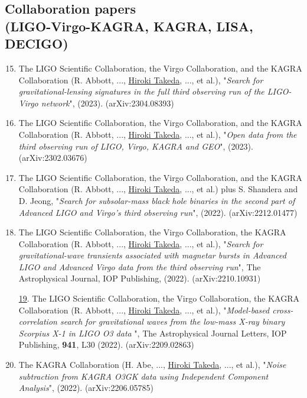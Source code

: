\documentclass[uplatex, 12pt]{article}
\begin{document}
\subsection*{Collaboration papers \\(LIGO-Virgo-KAGRA, KAGRA, LISA, DECIGO)}
\begin{enumerate}
\setcounter{enumi}{14}
\item The LIGO Scientific Collaboration, the Virgo Collaboration, and the KAGRA Collaboration (R. Abbott, ..., \uline{Hiroki Takeda}, ..., et al.), "\emph{Search for gravitational-lensing signatures in the full third observing run of the LIGO-Virgo network}", (2023). (arXiv:2304.08393)\\

\item The LIGO Scientific Collaboration, the Virgo Collaboration, and the KAGRA Collaboration (R. Abbott, ..., \uline{Hiroki Takeda}, ..., et al.), "\emph{Open data from the third observing run of LIGO, Virgo, KAGRA and GEO}", (2023). (arXiv:2302.03676)\\

\item The LIGO Scientific Collaboration, the Virgo Collaboration, and the KAGRA Collaboration (R. Abbott, ..., \uline{Hiroki Takeda}, ..., et al.) plus S. Shandera and D. Jeong, "\emph{Search for subsolar-mass black hole binaries in the second part of Advanced LIGO and Virgo's third observing run}", (2022). (arXiv:2212.01477)\\

\item The LIGO Scientific Collaboration, the Virgo Collaboration, the KAGRA Collaboration (R. Abbott, ..., \uline{Hiroki Takeda}, ..., et al.), "\emph{Search for gravitational-wave transients associated with magnetar bursts in Advanced LIGO and Advanced Virgo data from the third observing run}", The Astrophysical Journal, IOP Publishing, (2022). (arXiv:2210.10931)\\

\item[\uline{19}.] The LIGO Scientific Collaboration, the Virgo Collaboration, the KAGRA Collaboration (R. Abbott, ..., \uline{Hiroki Takeda}, ..., et al.), "\emph{Model-based cross-correlation search for gravitational waves from the low-mass X-ray binary Scorpius X-1 in LIGO O3 data }", The Astrophysical Journal Letters, IOP Publishing, {\bf 941}, L30 (2022). (arXiv:2209.02863)\\

\setcounter{enumi}{19}
\item The KAGRA Collaboration (H. Abe, ..., \uline{Hiroki Takeda}, ..., et al.), "\emph{Noise subtraction from KAGRA O3GK data using Independent Component Analysis}", (2022). (arXiv:2206.05785)\\


\end{enumerate}
\end{document}
